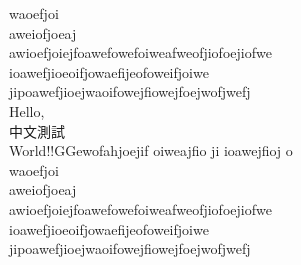 \documentclass[12pt]{article}
\begin{document}
waoefjoi\\
aweiofjoeaj\\
awioefjoiejfoawefowefoiweafweofjiofoejiofwe\\
ioawefjioeoifjowaefijeofoweifjoiwe\\
jipoawefjioejwaoifowejfiowejfoejwofjwefj\\Hello, \\中文測試\\World!!GGewofahjoejif oiweajfio ji ioawejfioj o\\
waoefjoi\\
aweiofjoeaj\\
awioefjoiejfoawefowefoiweafweofjiofoejiofwe\\
ioawefjioeoifjowaefijeofoweifjoiwe\\
jipoawefjioejwaoifowejfiowejfoejwofjwefj\\
\end{document}
